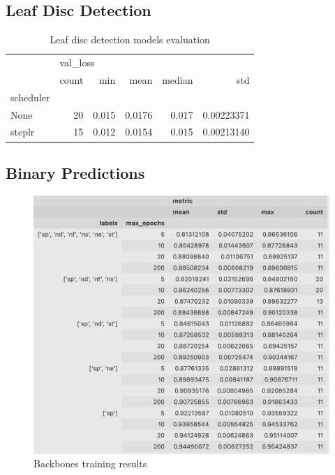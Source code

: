 \documentclass[english]{article}
\begin{document}
\subsection{Leaf Disc Detection}

\begin{table}[H]
\centering
\caption{Leaf disc detection models evaluation}
\label{tab:leafdiscdetectionresult}
\begin{tabular}{lrrrrr}
\toprule
{} & \multicolumn{5}{l}{val\_loss} \\
{} &    count &    min &    mean & median &         std \\
scheduler &          &        &         &        &             \\
\midrule
None      &       20 &  0.015 &  0.0176 &  0.017 &  0.00223371 \\
steplr    &       15 &  0.012 &  0.0154 &  0.015 &  0.00213140 \\
\bottomrule
\end{tabular}
\end{table}

\subsection{Binary Predictions}
\begin{figure}[H]
    \centering
    \includegraphics[width=0.9\linewidth]{p_viticola//resources//images/binary_models_result.png}
    \caption{Backbones training results}
    \label{fig:binbackbones}
\end{figure}
\end{document}
